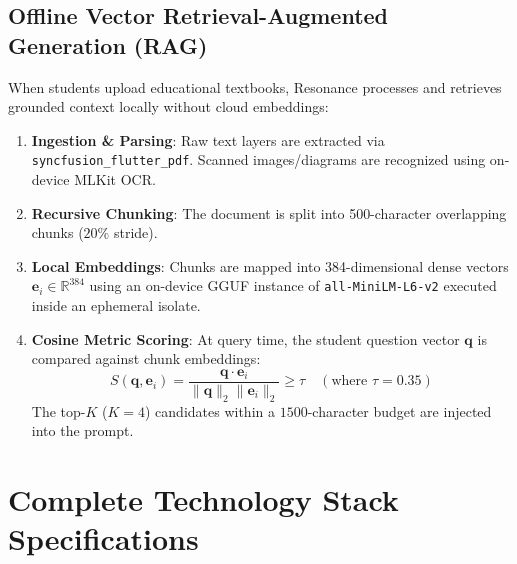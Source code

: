 \documentclass[10.5pt,a4paper]{article}
\begin{document}
\subsection{Offline Vector Retrieval-Augmented Generation (RAG)}
When students upload educational textbooks, Resonance processes and retrieves grounded context locally without cloud embeddings:
\begin{enumerate}[leftmargin=*,itemsep=0.5pt,topsep=1pt]
  \item \textbf{Ingestion \& Parsing}: Raw text layers are extracted via \texttt{syncfusion\_flutter\_pdf}. Scanned images/diagrams are recognized using on-device MLKit OCR.
  \item \textbf{Recursive Chunking}: The document is split into 500-character overlapping chunks ($20\%$ stride).
  \item \textbf{Local Embeddings}: Chunks are mapped into 384-dimensional dense vectors $\mathbf{e}_i \in \mathbb{R}^{384}$ using an on-device GGUF instance of \texttt{all-MiniLM-L6-v2} executed inside an ephemeral isolate.
  \item \textbf{Cosine Metric Scoring}: At query time, the student question vector $\mathbf{q}$ is compared against chunk embeddings:
  \begin{equation}
    S(\mathbf{q}, \mathbf{e}_i) = \frac{\mathbf{q} \cdot \mathbf{e}_i}{\|\mathbf{q}\|_2 \|\mathbf{e}_i\|_2} \ge \tau \quad (\text{where } \tau = 0.35)
  \end{equation}
  The top-$K$ ($K=4$) candidates within a $1500$-character budget are injected into the prompt.
\end{enumerate}

\clearpage

\section{Complete Technology Stack Specifications}
\end{document}

